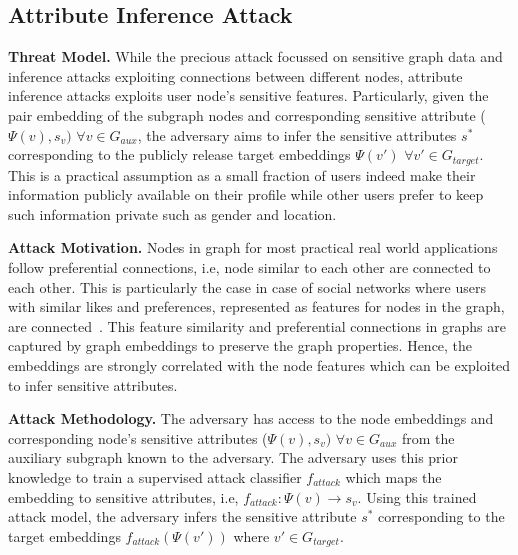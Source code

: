 \subsection{Attribute Inference Attack}

\noindent\textbf{Threat Model.} While the precious attack focussed on sensitive graph data and inference attacks exploiting connections between different nodes, attribute inference attacks exploits user node's sensitive features.
Particularly, given the pair embedding of the subgraph nodes and corresponding sensitive attribute ($\Psi (v), s_{v})$ $\forall v \in G_{aux}$, the adversary aims to infer the sensitive attributes $s^*$ corresponding to the publicly release target embeddings $\Psi (v')$ $\forall v' \in G_{target}$.
This is a practical assumption as a small fraction of users indeed make their information publicly available on their profile while other users prefer to keep such information private such as gender and location.

\noindent\textbf{Attack Motivation.} Nodes in graph for most practical real world applications follow preferential connections, i.e, node similar to each other are connected to each other.
This is particularly the case in case of social networks where users with similar likes and preferences, represented as features for nodes in the graph, are connected~\cite{socialinfer,socialinfer2}.
This feature similarity and preferential connections in graphs are captured by graph embeddings to preserve the graph properties.
Hence, the embeddings are strongly correlated with the node features which can be exploited to infer sensitive attributes.

\noindent\textbf{Attack Methodology.} The adversary has access to the node embeddings and corresponding node's sensitive attributes ($\Psi (v), s_{v})$ $\forall v \in G_{aux}$ from the auxiliary subgraph known to the adversary.
The adversary uses this prior knowledge to train a supervised attack classifier $f_{attack}$ which maps the embedding to sensitive attributes, i.e, $f_{attack}: \Psi (v) \rightarrow s_{v}$.
Using this trained attack model, the adversary infers the sensitive attribute $s^*$ corresponding to the target embeddings $f_{attack}(\Psi(v'))$ where $v' \in G_{target}$.
